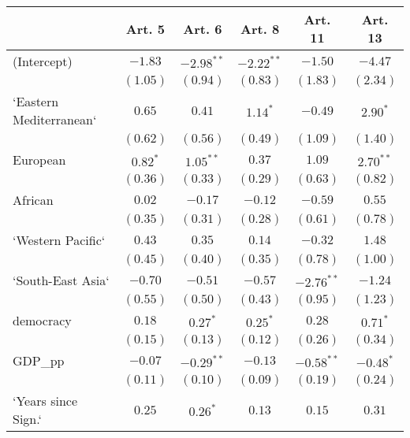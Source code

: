
\begin{table}[!h]
\begin{center}
\begin{tabular}{l c c c c c }
\toprule
 & Art. 5 & Art. 6 & Art. 8 & Art. 11 & Art. 13 \\
\midrule
(Intercept)             & $-1.83$      & $-2.98^{**}$ & $-2.22^{**}$ & $-1.50$      & $-4.47$      \\
                        & $(1.05)$     & $(0.94)$     & $(0.83)$     & $(1.83)$     & $(2.34)$     \\
`Eastern Mediterranean` & $0.65$       & $0.41$       & $1.14^{*}$   & $-0.49$      & $2.90^{*}$   \\
                        & $(0.62)$     & $(0.56)$     & $(0.49)$     & $(1.09)$     & $(1.40)$     \\
European                & $0.82^{*}$   & $1.05^{**}$  & $0.37$       & $1.09$       & $2.70^{**}$  \\
                        & $(0.36)$     & $(0.33)$     & $(0.29)$     & $(0.63)$     & $(0.82)$     \\
African                 & $0.02$       & $-0.17$      & $-0.12$      & $-0.59$      & $0.55$       \\
                        & $(0.35)$     & $(0.31)$     & $(0.28)$     & $(0.61)$     & $(0.78)$     \\
`Western Pacific`       & $0.43$       & $0.35$       & $0.14$       & $-0.32$      & $1.48$       \\
                        & $(0.45)$     & $(0.40)$     & $(0.35)$     & $(0.78)$     & $(1.00)$     \\
`South-East Asia`       & $-0.70$      & $-0.51$      & $-0.57$      & $-2.76^{**}$ & $-1.24$      \\
                        & $(0.55)$     & $(0.50)$     & $(0.43)$     & $(0.95)$     & $(1.23)$     \\
democracy               & $0.18$       & $0.27^{*}$   & $0.25^{*}$   & $0.28$       & $0.71^{*}$   \\
                        & $(0.15)$     & $(0.13)$     & $(0.12)$     & $(0.26)$     & $(0.34)$     \\
GDP\_pp                 & $-0.07$      & $-0.29^{**}$ & $-0.13$      & $-0.58^{**}$ & $-0.48^{*}$  \\
                        & $(0.11)$     & $(0.10)$     & $(0.09)$     & $(0.19)$     & $(0.24)$     \\
`Years since Sign.`     & $0.25$       & $0.26^{*}$   & $0.13$       & $0.15$       & $0.31$       \\

\end{tabular}
\end{center}
\end{table}
